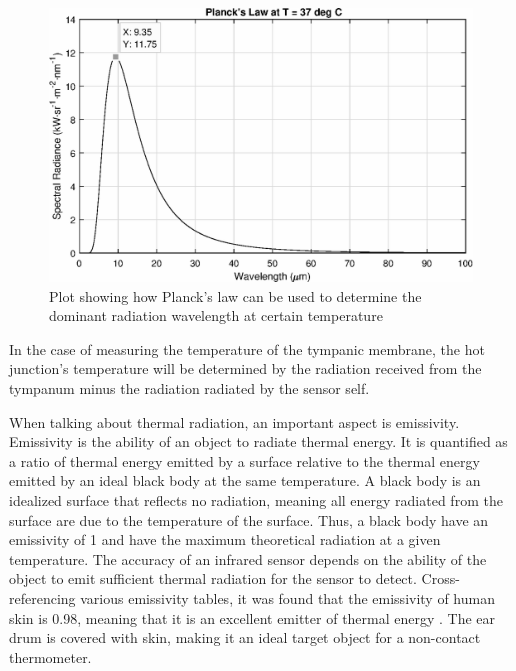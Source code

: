\medskip

 \begin{figure}[h]
   \centering
   \includegraphics[scale=0.6]{figs/PlancksLaw}
   \caption{Plot showing how Planck's law can be used to determine the dominant radiation wavelength at certain temperature}
   \label{fig:PlancksLaw}
\end{figure}

In the case of measuring the temperature of the tympanic membrane, the hot junction's temperature will be determined by the radiation received from the tympanum minus the radiation radiated by the sensor self.

\medskip

When talking about thermal radiation, an important aspect is emissivity. Emissivity is the ability of an object to radiate thermal energy. It is quantified as a ratio of thermal energy emitted by a surface relative to the thermal energy emitted by an ideal black body at the same temperature. A black body is an idealized surface that reflects no radiation, meaning all energy radiated from the surface are due to the temperature of the surface. Thus, a black body have an emissivity of 1 and have the maximum theoretical radiation at a given temperature. The accuracy of an infrared sensor depends on the ability of the object to emit sufficient thermal radiation for the sensor to detect. Cross-referencing various emissivity tables, it was found that the emissivity of human skin is 0.98, meaning that it is an excellent emitter of thermal energy \citep{stumme2003emissivity} \citep{EmissivityThermoWorks} \citep{EmissivityOptotherm}. The ear drum is covered with skin, making it an ideal target object for a non-contact thermometer.

